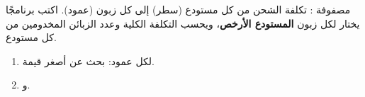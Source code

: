 \begin{statement}
مصفوفة : تكلفة الشحن من كل مستودع (سطر) إلى كل زبون (عمود). اكتب برنامجًا يختار لكل زبون \textbf{المستودع الأرخص}، ويحسب التكلفة الكلية وعدد الزبائن المخدومين من كل مستودع.
\end{statement}
\begin{stepsbox}\begin{enumerate}
\item لكل عمود: بحث عن أصغر قيمة.
\item {} و.
\end{enumerate}\end{stepsbox}

